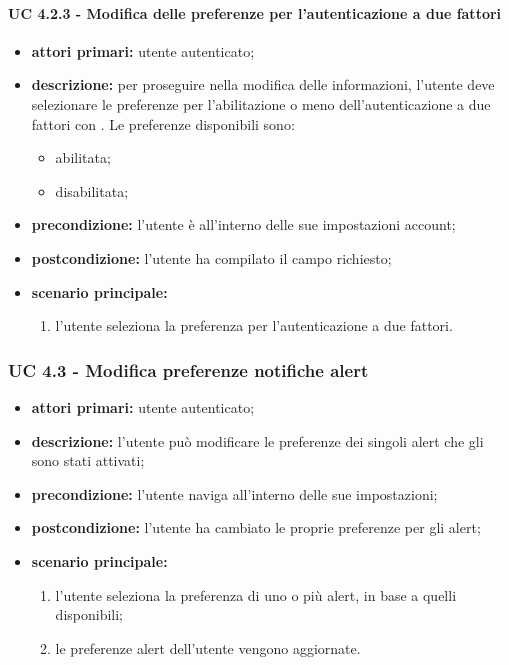 				\paragraph{UC 4.2.3 - Modifica delle preferenze per l'autenticazione a due fattori}
				\begin{itemize}
					\item \textbf{attori primari:} utente autenticato;
					\item \textbf{descrizione:} per proseguire nella modifica delle informazioni, l'utente deve selezionare le preferenze per l'abilitazione o meno dell'autenticazione a due fattori con . Le preferenze disponibili sono:
					\begin{itemize}
						\item abilitata;
						\item disabilitata;
					\end{itemize}
					\item \textbf{precondizione:} l'utente è all'interno delle sue impostazioni account;
					\item \textbf{postcondizione:} l'utente ha compilato il campo richiesto;
					\item \textbf{scenario principale:}
					\begin{enumerate}
						\item l'utente seleziona la preferenza per l'autenticazione a due fattori.
					\end{enumerate}
				\end{itemize}


			\subsubsection{UC 4.3 - Modifica preferenze notifiche alert}
			\begin{itemize}
				\item \textbf{attori primari:} utente autenticato;
				\item \textbf{descrizione:} l'utente può modificare le preferenze dei singoli alert che gli sono stati attivati;
				\item \textbf{precondizione:} l'utente naviga all'interno delle sue impostazioni;
				\item \textbf{postcondizione:} l'utente ha cambiato le proprie preferenze per gli alert;
				\item \textbf{scenario principale:}
				\begin{enumerate}
					\item{l'utente seleziona la preferenza di uno o più alert, in base a quelli disponibili;}
					\item{le preferenze alert dell'utente vengono aggiornate.}
				\end{enumerate}
			\end{itemize}


